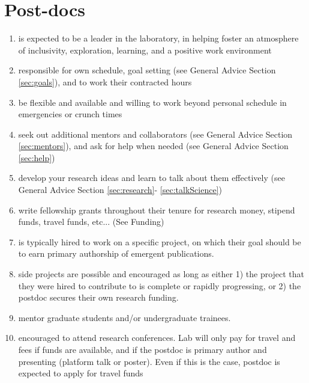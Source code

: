 \documentclass[12pt]{article}
\begin{document}
\section{Post-docs}
\begin{enumerate}
\item is expected to be a leader in the laboratory, in helping foster
  an atmosphere of inclusivity, exploration, learning, and a positive
  work environment
\item  responsible for own schedule, goal setting (see General
  Advice Section \ref{sec:goals}), and to work their contracted hours
\item be flexible and available and willing to work beyond personal
  schedule in emergencies or crunch times
\item seek out additional mentors and collaborators (see General
  Advice Section \ref{sec:mentors}), and ask for help when needed (see
  General Advice Section \ref{sec:help})
\item develop your research ideas and learn to talk about them
  effectively (see General Advice Section \ref{sec:research}-
  \ref{sec:talkScience})
\item  write fellowship grants throughout their tenure
  for research money, stipend funds, travel funds, etc... (See Funding)
\item is typically hired to work on a specific project, on which
  their goal should be to earn primary authorship of emergent
  publications.
\item side projects are possible and encouraged as long as either 1)
  the project that they were hired to contribute to is complete or
  rapidly progressing, or 2) the postdoc secures their own research
  funding.
\item mentor graduate students and/or undergraduate trainees.
\item encouraged to attend research conferences. Lab will only pay
  for travel and fees if funds are available, and if the postdoc is
  primary author and presenting (platform talk or poster). Even if
  this is the case, postdoc is expected to apply for travel funds
\end{enumerate}
\end{document}
